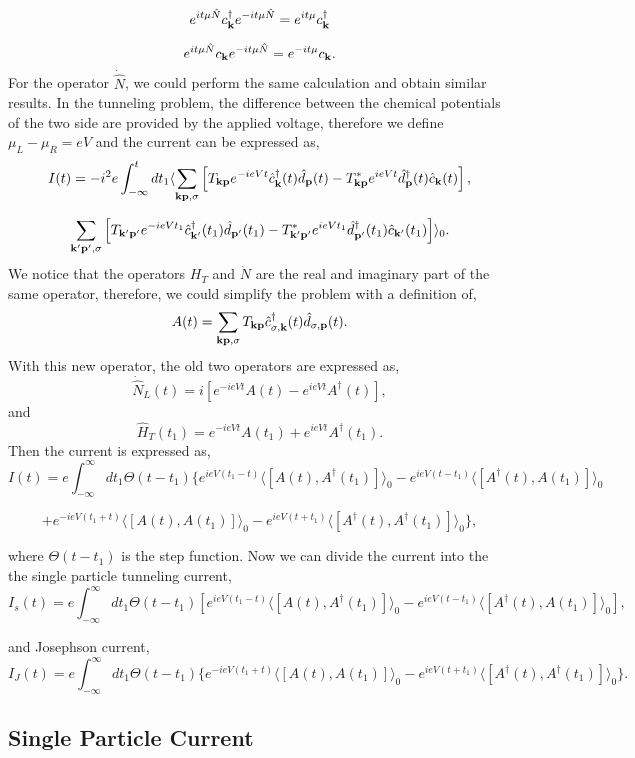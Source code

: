 \documentclass[11pt]{article}
\begin{document}
\[
e^{it \mu {\hat N}}c^{\dagger}_{{\bf k}}e^{-it \mu {\hat N}}=e^{it
\mu}c^{\dagger}_{{\bf k}}
\]

\[
e^{it \mu {\hat N}}c_{{\bf k}}e^{-it \mu {\hat N}}=e^{-it
\mu}c_{{\bf k}}.
\] For the operator \(\dot {\hat N}\), we could perform the same
calculation and obtain similar results. In the tunneling problem, the
difference between the chemical potentials of the two side are provided
by the applied voltage, therefore we define \(\mu_L-\mu_R=eV\) and the
current can be expressed as, \[
I(t)=- i^2 e \int_{-\infty}^{t} dt_1  \langle \sum_{{\bf {\bf k}}{\bf {\bf
p}},\sigma} \left[T_{{\bf k}{\bf p}}e^{-ieVt} \hat c^{\dagger}_{{\bf k}} (t)
\hat d_{{\bf p}}(t)-T^{*}_{{\bf k}{\bf p}} e^{ieVt} \hat d^{\dagger}_{{\bf p}}(t) \hat c_{{\bf k}}(t)\right],
\]

\[
\sum_{{\bf {\bf k}'}{\bf {\bf p}'},\sigma} \left[T_{{\bf k}'{\bf
p}'}e^{-ieVt_1} \hat c^{\dagger}_{{\bf k}'} (t_1) \hat d_{{\bf
p}'}(t_1)-T^{*}_{{\bf k}'{\bf p}'} e^{ieVt_1} \hat d^{\dagger}_{{\bf
p}'}(t_1) \hat c_{{\bf k}'}(t_1)\right]  \rangle_0.
\] We notice that the operators \(H_T\) and \(\dot N\) are the real and
imaginary part of the same operator, therefore, we could simplify the
problem with a definition of, \[
A(t)= \sum_{\bf k p,\sigma} T_{\bf k p} \hat c_{\sigma,\bf
k}^{\dagger}(t) \hat d_{\sigma,\bf p}(t).
\] With this new operator, the old two operators are expressed as, \[
\dot{\hat N}_L(t)=i[e^{-ieVt}A(t)-e^{ieVt}A^{\dagger}(t)],
\] and \[
\hat H_T(t_1)=e^{-ieVt}A(t_1)+e^{ieVt}A^{\dagger}(t_1).
\] Then the current is expressed as, \[
I(t)=e \int_{-\infty}^{\infty} dt_1 \Theta(t-t_1)
\{e^{ieV(t_1-t)} \langle  [A(t),A^{\dagger}(t_1)] \rangle_0 -e^{ieV(t-t_1)} \langle  [A^{\dagger}(t),A(t_1)] \rangle_0 \]

\[
+
e^{-ieV(t_1+t)} \langle  [A(t),A(t_1)] \rangle_0 -e^{ieV(t+t_1)} \langle  [A^{\dagger}(t),A^{\dagger}(t_1)] \rangle_0 \},
\]

where \(\Theta(t-t_1)\) is the step function. Now we can divide the
current into the the single particle tunneling current, \[
I_s(t)=e \int_{-\infty}^{\infty} dt_1 \Theta(t-t_1)
\left[e^{ieV(t_1-t)} \langle  [A(t),A^{\dagger}(t_1)] \rangle_0 -e^{ieV(t-t_1)} \langle  [A^{\dagger}(t),A(t_1)] \rangle_0 
\right],
\]

and Josephson current, \[
I_J(t)=e \int_{-\infty}^{\infty} dt_1 \Theta(t-t_1) \{
e^{-ieV(t_1+t)} \langle  [A(t),A(t_1)] \rangle_0 -e^{ieV(t+t_1)} \langle  [A^{\dagger}(t),A^{\dagger}(t_1)] \rangle_0 \}. 
\]

    \hypertarget{single-particle-current}{%
\subsection{Single Particle Current}\label{single-particle-current}}
\end{document}
